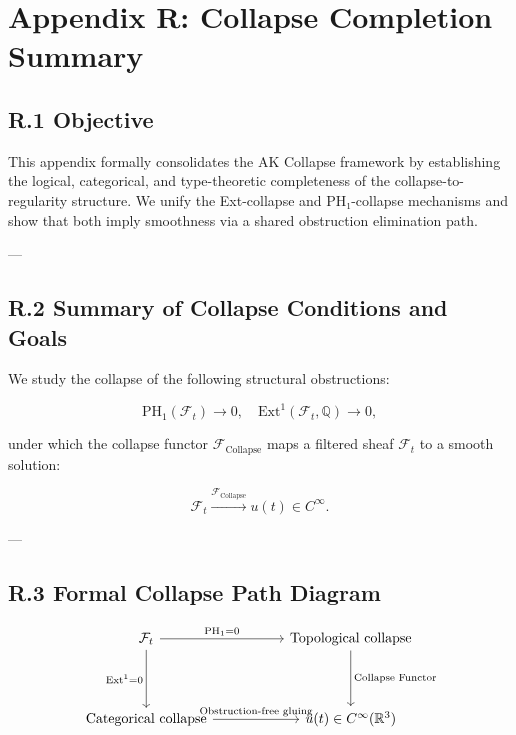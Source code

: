 \documentclass[11pt]{article}
\begin{document}

\section*{Appendix R: Collapse Completion Summary}

\subsection*{R.1 Objective}

This appendix formally consolidates the AK Collapse framework by establishing the logical, categorical, and type-theoretic completeness of the collapse-to-regularity structure.  
We unify the Ext-collapse and PH₁-collapse mechanisms and show that both imply smoothness via a shared obstruction elimination path.

---

\subsection*{R.2 Summary of Collapse Conditions and Goals}

We study the collapse of the following structural obstructions:

\[
\mathrm{PH}_1(\mathcal{F}_t) \to 0, \quad \mathrm{Ext}^1(\mathcal{F}_t, \mathbb{Q}) \to 0,
\]

under which the collapse functor $\mathcal{F}_{\mathrm{Collapse}}$ maps a filtered sheaf $\mathcal{F}_t$ to a smooth solution:

\[
\mathcal{F}_t \xrightarrow{\mathcal{F}_{\mathrm{Collapse}}} u(t) \in C^\infty.
\]

---

\subsection*{R.3 Formal Collapse Path Diagram}

\[
\begin{tikzcd}[column sep=1.8cm, row sep=1.4cm]
\mathcal{F}_t \arrow[r, "\mathrm{PH}_1 = 0"] \arrow[d, "\mathrm{Ext}^1 = 0"']
& \text{Topological collapse} \arrow[d, "\text{Collapse Functor}"] \\
\text{Categorical collapse} \arrow[r, "\text{Obstruction-free gluing}"]
& u(t) \in C^\infty(\mathbb{R}^3)
\end{tikzcd}
\]
\end{document}
